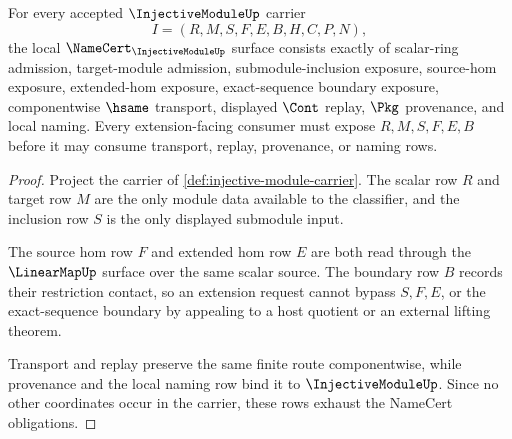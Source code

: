\begin{theorem}
\label{thm:injective-module-namecert-obligations}
For every accepted $\InjectiveModuleUp$ carrier
$$
I=(R,M,S,F,E,B,H,C,P,N),
$$
the local $\NameCert_{\InjectiveModuleUp}$ surface consists exactly of scalar-ring admission, target-module admission, submodule-inclusion exposure, source-hom exposure, extended-hom exposure, exact-sequence boundary exposure, componentwise $\hsame$ transport, displayed $\Cont$ replay, $\Pkg$ provenance, and local naming. Every extension-facing consumer must expose $R,M,S,F,E,B$ before it may consume transport, replay, provenance, or naming rows.
\end{theorem}
\begin{proof}
Project the carrier of \autoref{def:injective-module-carrier}. The scalar row $R$ and target row $M$ are the only module data available to the classifier, and the inclusion row $S$ is the only displayed submodule input.

The source hom row $F$ and extended hom row $E$ are both read through the $\LinearMapUp$ surface over the same scalar source. The boundary row $B$ records their restriction contact, so an extension request cannot bypass $S,F,E$, or the exact-sequence boundary by appealing to a host quotient or an external lifting theorem.

Transport and replay preserve the same finite route componentwise, while provenance and the local naming row bind it to $\InjectiveModuleUp$. Since no other coordinates occur in the carrier, these rows exhaust the NameCert obligations.
\end{proof}

